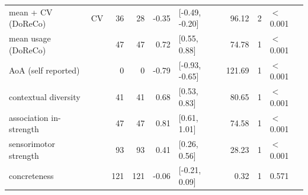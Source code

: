\begin{table}[ht]
\begin{tabular}{llrrrlrrl}
  mean + CV (DoReCo) & CV & 36 & 28 & -0.35 & [-0.49, -0.20] & 96.12 & 2 & $<$ 0.001 \\ 
  mean usage (DoReCo) &  & 47 & 47 & 0.72 & [0.55, 0.88] & 74.78 & 1 & $<$ 0.001 \\ 
  AoA (self reported) &  & 0 & 0 & -0.79 & [-0.93, -0.65] & 121.69 & 1 & $<$ 0.001 \\ 
  contextual diversity &  & 41 & 41 & 0.68 & [0.53, 0.83] & 80.65 & 1 & $<$ 0.001 \\ 
  association in-strength &  & 47 & 47 & 0.81 & [0.61, 1.01] & 74.58 & 1 & $<$ 0.001 \\ 
  sensorimotor strength &  & 93 & 93 & 0.41 & [0.26, 0.56] & 28.23 & 1 & $<$ 0.001 \\ 
  concreteness &  & 121 & 121 & -0.06 & [-0.21, 0.09] & 0.32 & 1 & 0.571 \\ 
   \hline
\end{tabular}
\end{table}
